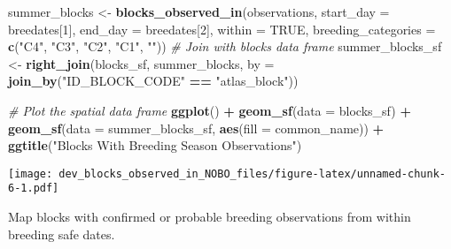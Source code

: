 \documentclass[
]{article}
\newenvironment{Shaded}{\begin{snugshade}}{\end{snugshade}}
\newcommand{\AttributeTok}[1]{\textcolor[rgb]{0.13,0.29,0.53}{#1}}
\newcommand{\CommentTok}[1]{\textcolor[rgb]{0.56,0.35,0.01}{\textit{#1}}}
\newcommand{\ConstantTok}[1]{\textcolor[rgb]{0.56,0.35,0.01}{#1}}
\newcommand{\DecValTok}[1]{\textcolor[rgb]{0.00,0.00,0.81}{#1}}
\newcommand{\FunctionTok}[1]{\textcolor[rgb]{0.13,0.29,0.53}{\textbf{#1}}}
\newcommand{\NormalTok}[1]{#1}
\newcommand{\OtherTok}[1]{\textcolor[rgb]{0.56,0.35,0.01}{#1}}
\newcommand{\SpecialCharTok}[1]{\textcolor[rgb]{0.81,0.36,0.00}{\textbf{#1}}}
\newcommand{\StringTok}[1]{\textcolor[rgb]{0.31,0.60,0.02}{#1}}
\begin{document}
\begin{Shaded}
\begin{Highlighting}[]
\NormalTok{summer\_blocks }\OtherTok{\textless{}{-}} \FunctionTok{blocks\_observed\_in}\NormalTok{(observations, }\AttributeTok{start\_day =}\NormalTok{ breedates[}\DecValTok{1}\NormalTok{], }
                                    \AttributeTok{end\_day =}\NormalTok{ breedates[}\DecValTok{2}\NormalTok{], }
                                    \AttributeTok{within =} \ConstantTok{TRUE}\NormalTok{,}
                                    \AttributeTok{breeding\_categories =} \FunctionTok{c}\NormalTok{(}\StringTok{"C4"}\NormalTok{, }\StringTok{"C3"}\NormalTok{, }\StringTok{"C2"}\NormalTok{, }
                                                            \StringTok{"C1"}\NormalTok{, }\StringTok{""}\NormalTok{))}
\CommentTok{\# Join with blocks data frame}
\NormalTok{summer\_blocks\_sf }\OtherTok{\textless{}{-}} \FunctionTok{right\_join}\NormalTok{(blocks\_sf, summer\_blocks, }
                               \AttributeTok{by =} \FunctionTok{join\_by}\NormalTok{(}\StringTok{"ID\_BLOCK\_CODE"} \SpecialCharTok{==} \StringTok{"atlas\_block"}\NormalTok{))}

\CommentTok{\# Plot the spatial data frame}
\FunctionTok{ggplot}\NormalTok{() }\SpecialCharTok{+}
  \FunctionTok{geom\_sf}\NormalTok{(}\AttributeTok{data =}\NormalTok{ blocks\_sf) }\SpecialCharTok{+}
  \FunctionTok{geom\_sf}\NormalTok{(}\AttributeTok{data =}\NormalTok{ summer\_blocks\_sf, }\FunctionTok{aes}\NormalTok{(}\AttributeTok{fill =}\NormalTok{ common\_name)) }\SpecialCharTok{+}
  \FunctionTok{ggtitle}\NormalTok{(}\StringTok{"Blocks With Breeding Season Observations"}\NormalTok{)}
\end{Highlighting}
\end{Shaded}

\texttt{[image: dev\_blocks\_observed\_in\_NOBO\_files/figure-latex/unnamed-chunk-6-1.pdf]}

Map blocks with confirmed or probable breeding observations from within
breeding safe dates.
\end{document}
